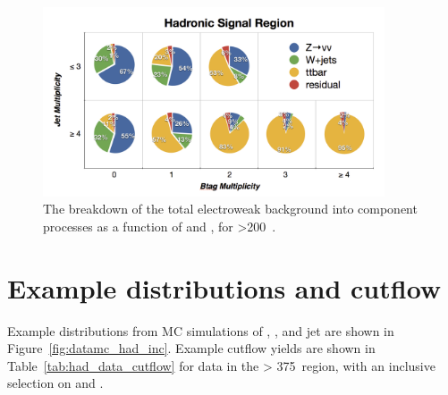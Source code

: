 \begin{figure}[t]
\centering
\hspace{0cm}\includegraphics[width=0.9\textwidth, trim=0 00 0 0, clip=true]
{Figs/ra1_had_bg_comp_v3.png}
\caption{The breakdown of the total electroweak background into component
processes as a function of \nj and \nb, for \HT>200~\gev.}
\label{fig:background_decomp}
\end{figure}

\section{Example distributions and cutflow}

Example distributions from MC simulations of \alphat, \HT, \mht and jet \Pt  are
shown in Figure~\ref{fig:datamc_had_inc}. Example cutflow yields are shown in
Table~\ref{tab:had_data_cutflow} for data in the \HT > 375~\gev region, with an
inclusive selection on \nj and \nb.


